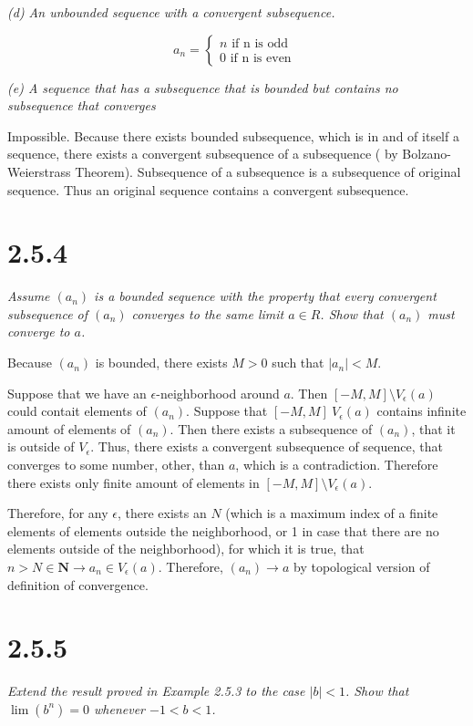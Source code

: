 \documentclass[11pt,oneside,titlepage]{book}
\begin{document}
\textit{(d) An unbounded sequence with a convergent subsequence.}

\begin{equation}
  a_n =
  \begin{cases}
    n \text{ if n is odd } \\
    0 \text{ if n is even }
  \end{cases}
\end{equation}

\textit{(e) A sequence that has a subsequence that is bounded but contains no
  subsequence that converges}

Impossible. Because there exists bounded subsequence, which is in and of itself
a sequence, there exists a convergent subsequence of a subsequence ( by
Bolzano-Weierstrass Theorem). Subsequence of a subsequence is a subsequence of
original sequence. Thus an original sequence contains a convergent
subsequence.

\section*{2.5.4}
\textit{Assume $(a_n)$ is a bounded sequence with the property that every
  convergent subsequence of $(a_n)$ converges to the same limit $a \in R$.
  Show that $(a_n)$ must converge to $a$.}


Because $(a_n)$ is bounded, there exists $M > 0$ such that
$|a_n| < M$.

Suppose that we have an $\epsilon$-neighborhood around $a$. Then
$[-M, M] \setminus V_{\epsilon}(a)$ could contait elements of $(a_n)$.
Suppose that $[-M, M] \ V_{\epsilon}(a)$ contains infinite amount of elements
of $(a_n)$. Then there exists a subsequence of $(a_n)$, that
it is outside of  $V_{\epsilon}$. Thus, there exists a convergent subsequence
of sequence, that converges to some number, other, than $a$, which is a
contradiction. Therefore there exists only finite amount of elements in
$[-M, M] \setminus V_{\epsilon}(a)$.

Therefore, for any $\epsilon$, there exists an $N$ (which is
a maximum index of a finite elements of elements outside the neighborhood, or
1 in case that there are no elements outside of the neighborhood),
for which it is true, that $n > N \in \textbf{N} \to a_n \in V_{\epsilon}(a)$.
Therefore, $(a_n) \to a$ by topological version of definition of convergence.

\section*{2.5.5}
\textit{Extend the result proved in Example 2.5.3 to the case $|b| < 1$.
  Show that $\lim (b^n) = 0$ whenever $-1 < b < 1$.}
\end{document}
